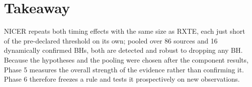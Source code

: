 \section{Takeaway}
NICER repeats both timing effects with the same size as RXTE, each just short of the pre-declared threshold on its own; pooled over
86 sources and 16 dynamically confirmed BHs, both are detected and robust to dropping any BH. Because the hypotheses and the pooling
were chosen after the component results, Phase 5 measures the overall strength of the evidence rather than confirming it. Phase 6
therefore freezes a rule and tests it prospectively on new observations.
